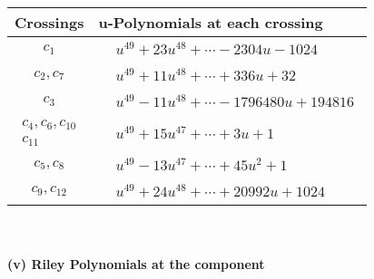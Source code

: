 \documentclass[1p]{elsarticle_modified}
\theoremstyle{definition}
\begin{document}
\begin{tabular}{m{50pt}|m{274pt}}
Crossings & \hspace{64pt}u-Polynomials at each crossing \\
\hline $$\begin{aligned}c_{1}\end{aligned}$$&$\begin{aligned}
&u^{49}+23 u^{48}+\cdots-2304 u-1024
\end{aligned}$\\
\hline $$\begin{aligned}c_{2},c_{7}\end{aligned}$$&$\begin{aligned}
&u^{49}+11 u^{48}+\cdots+336 u+32
\end{aligned}$\\
\hline $$\begin{aligned}c_{3}\end{aligned}$$&$\begin{aligned}
&u^{49}-11 u^{48}+\cdots-1796480 u+194816
\end{aligned}$\\
\hline $$\begin{aligned}c_{4},c_{6},c_{10}\\c_{11}\end{aligned}$$&$\begin{aligned}
&u^{49}+15 u^{47}+\cdots+3 u+1
\end{aligned}$\\
\hline $$\begin{aligned}c_{5},c_{8}\end{aligned}$$&$\begin{aligned}
&u^{49}-13 u^{47}+\cdots+45 u^2+1
\end{aligned}$\\
\hline $$\begin{aligned}c_{9},c_{12}\end{aligned}$$&$\begin{aligned}
&u^{49}+24 u^{48}+\cdots+20992 u+1024
\end{aligned}$\\
\hline
\end{tabular}\\~\\
\newpage\renewcommand{\arraystretch}{1}
\flushleft \textbf{(v) Riley Polynomials at the component}\newline \\
\end{document}
